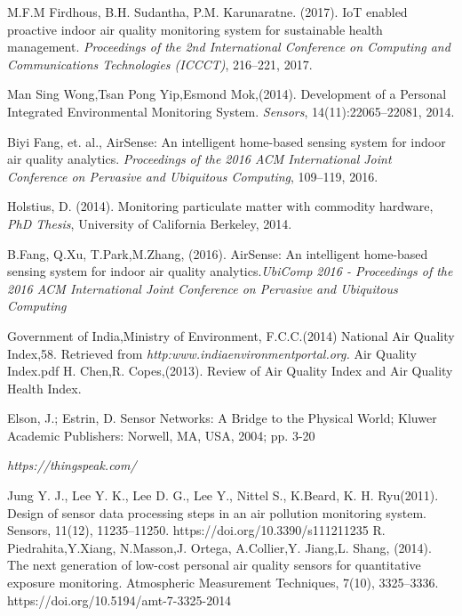 \documentclass[11pt]{article}
\begin{document}
\begin{thebibliography}{abrv}
 M.F.M Firdhous, B.H. Sudantha, P.M. Karunaratne. (2017). IoT enabled proactive indoor air quality monitoring system for sustainable health management. 
{\it Proceedings of the 2nd International Conference on Computing and Communications Technologies (ICCCT)}, 216--221, 2017.

 Man Sing Wong,Tsan Pong Yip,Esmond Mok,(2014). Development of a Personal Integrated Environmental Monitoring System. {\it Sensors}, 14(11):22065--22081, 2014. 

 Biyi Fang, et. al.,  AirSense: An intelligent home-based sensing system for indoor air quality analytics. {\it Proceedings of the 2016 ACM International Joint Conference on Pervasive and Ubiquitous Computing}, 109--119, 2016.

 Holstius, D. (2014). Monitoring particulate matter with commodity hardware, {\it PhD Thesis}, University of California Berkeley, 2014.

 B.Fang, Q.Xu, T.Park,M.Zhang, (2016). AirSense: An intelligent home-based sensing system for indoor air quality analytics.{\it UbiComp 2016 - Proceedings of the 2016 ACM International Joint Conference on Pervasive and Ubiquitous Computing}

 Government of India,Ministry of Environment, F.C.C.(2014) National Air Quality Index,58. Retrieved from {\it http:www.indiaenvironmentportal.org.} Air Quality Index.pdf
  H. Chen,R. Copes,(2013). Review of Air Quality Index and Air Quality Health Index.

 Elson, J.; Estrin, D. Sensor Networks: A Bridge to the Physical World; Kluwer Academic Publishers: Norwell, MA, USA, 2004; pp. 3-20

 {\it https://thingspeak.com/}

 Jung Y. J., Lee Y. K., Lee D. G., Lee Y., Nittel S., K.Beard, K. H. Ryu(2011). Design of sensor data processing steps in an air pollution monitoring system. Sensors, 11(12), 11235–11250. https://doi.org/10.3390/s111211235
  R. Piedrahita,Y.Xiang, N.Masson,J. Ortega, A.Collier,Y. Jiang,L. Shang, (2014). The next generation of low-cost personal air quality sensors for quantitative exposure monitoring. Atmospheric Measurement Techniques, 7(10), 3325–3336. https://doi.org/10.5194/amt-7-3325-2014

\end{thebibliography}
\end{document}
